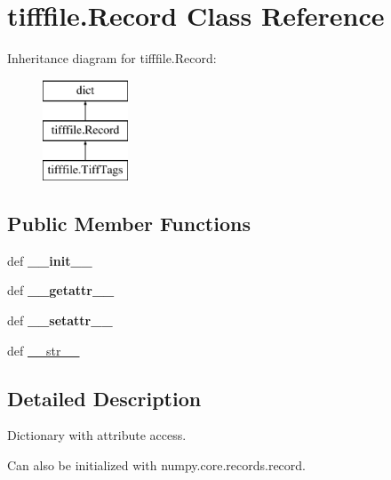 \hypertarget{classtifffile_1_1Record}{\section{tifffile.\-Record Class Reference}
\label{classtifffile_1_1Record}
}
Inheritance diagram for tifffile.\-Record\-:\begin{figure}[H]
\begin{center}
\leavevmode
\includegraphics[height=3.000000cm]{classtifffile_1_1Record}
\end{center}
\end{figure}
\subsection*{Public Member Functions}
\begin{DoxyCompactItemize}
\item 
\hypertarget{classtifffile_1_1Record_a0ff543c8d9ef139ba868177e0db7ac02}{def {\bfseries \-\_\-\-\_\-init\-\_\-\-\_\-}}\label{classtifffile_1_1Record_a0ff543c8d9ef139ba868177e0db7ac02}

\item 
\hypertarget{classtifffile_1_1Record_aeba3dd18a66ecb80f9d6fc09dae33a5d}{def {\bfseries \-\_\-\-\_\-getattr\-\_\-\-\_\-}}\label{classtifffile_1_1Record_aeba3dd18a66ecb80f9d6fc09dae33a5d}

\item 
\hypertarget{classtifffile_1_1Record_a2fc93e114d60c64619cd6ea297c186bf}{def {\bfseries \-\_\-\-\_\-setattr\-\_\-\-\_\-}}\label{classtifffile_1_1Record_a2fc93e114d60c64619cd6ea297c186bf}

\item 
def \hyperlink{classtifffile_1_1Record_a6462a5901c01bd8644032e4c55005e57}{\-\_\-\-\_\-str\-\_\-\-\_\-}
\end{DoxyCompactItemize}


\subsection{Detailed Description}
\begin{DoxyVerb}Dictionary with attribute access.

Can also be initialized with numpy.core.records.record.\end{DoxyVerb}
 

